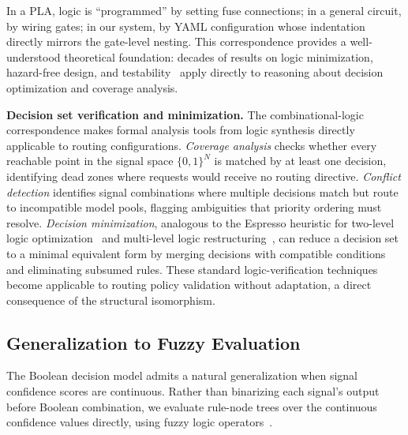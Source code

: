 In a PLA, logic is ``programmed'' by setting fuse connections; in a general circuit, by wiring gates; in our system, by YAML configuration whose indentation directly mirrors the gate-level nesting.
This correspondence provides a well-understood theoretical foundation: decades of results on logic minimization, hazard-free design, and testability~\cite{brayton1984logic} apply directly to reasoning about decision optimization and coverage analysis.

\noindent\textbf{Decision set verification and minimization.}
The combinational-logic correspondence makes formal analysis tools from logic synthesis directly applicable to routing configurations.
\emph{Coverage analysis} checks whether every reachable point in the signal space $\{0,1\}^N$ is matched by at least one decision, identifying dead zones where requests would receive no routing directive.
\emph{Conflict detection} identifies signal combinations where multiple decisions match but route to incompatible model pools, flagging ambiguities that priority ordering must resolve.
\emph{Decision minimization}, analogous to the Espresso heuristic for two-level logic optimization~\cite{brayton1984logic} and multi-level logic restructuring~\cite{brayton1984logic}, can reduce a decision set to a minimal equivalent form by merging decisions with compatible conditions and eliminating subsumed rules.
These standard logic-verification techniques become applicable to routing policy validation without adaptation, a direct consequence of the structural isomorphism.

\subsection{Generalization to Fuzzy Evaluation}

The Boolean decision model admits a natural generalization when signal confidence scores are continuous.
Rather than binarizing each signal's output before Boolean combination, we evaluate rule-node trees over the continuous confidence values directly, using fuzzy logic operators~\cite{zadeh1965fuzzy}.


